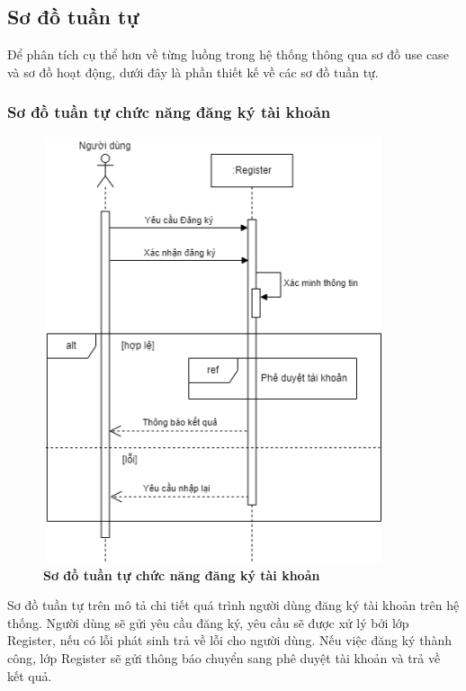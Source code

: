 \subsection{Sơ đồ tuần tự}
Để phân tích cụ thể hơn về từng luồng trong hệ thống thông qua sơ đồ use case và sơ đồ hoạt động, dưới đây là phần thiết kế
 về các sơ đồ tuần tự.

\subsubsection{Sơ đồ tuần tự chức năng đăng ký tài khoản}
\begin{figure}[H]
  \centering
  \includegraphics[width=10cm,height=12.5cm]{Images/sequence/sequence_register.png}
  \caption[Sơ đồ tuần tự chức năng đăng ký tài khoản]{\bfseries \fontsize{12pt}{0pt}
  \selectfont Sơ đồ tuần tự chức năng đăng ký tài khoản}
  \label{sequence_register} %
\end{figure}
Sơ đồ tuần tự trên mô tả chi tiết quá trình người dùng đăng ký tài khoản trên hệ thống. Người dùng sẽ gửi yêu cầu đăng ký, yêu cầu sẽ được xử lý
bởi lớp Register, nếu có lỗi phát sinh trả về lỗi cho người dùng. Nếu việc đăng ký thành công, lớp Register sẽ gửi thông báo 
chuyển sang phê duyệt tài khoản và trả về kết quả.  

